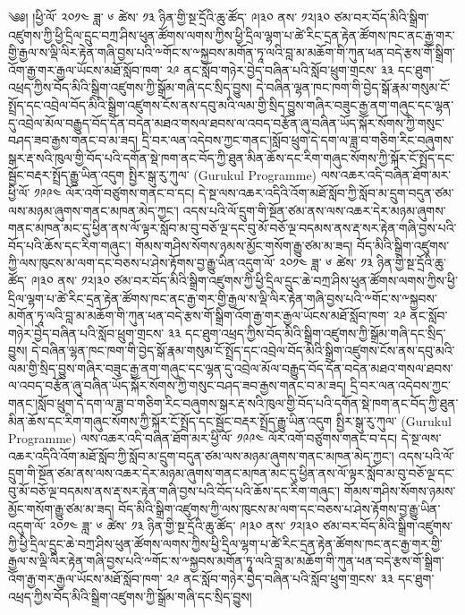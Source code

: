 \documentclass{article}
\begin{document}
\Large ༄༅། །ཕྱི་ལོ་ ༢༠༡༤ ཟླ་ ༦ ཚེས་ ༡༣ ཉིན་གྱི་སྔ་དྲོའི་ཆུ་ཚོད་ ༩།༣༠ ནས་ ༡༢།༣༠ \newpage ཙམ་བར་བོད་མིའི་སྒྲིག་འཛུགས་ཀྱི་ཕྱི་དྲིལ་དྲུང་བཀྲ་ཤིས་ཕུན་ཚོགས་ལགས་ཀྱིས་ཕྱི་དྲིལ་ལྷག་པ་ཚེ་རིང་དྲན་རྟེན་ཚོགས་ཁང་ནང་རྒྱ་གར་གྱི་རྒྱལ་ས་ལྡི་ལིར་རྟེན་གཞི་བྱས་པའི་༸གོང་ས་༸སྐྱབས་མགོན་ཏཱ་ལའི་བླ་མ་མཆོག་གི་ཀུན་ཕན་བདེ་རྩས་གོ་སྒྲིག་འོག་རྒྱ་གར་རྒྱལ་ཡོངས་མཐོ་སློབ་ཁག་ ༢༩ ནང་སློབ་གཉེར་བྱེད་བཞིན་པའི་སློབ་ཕྲུག་གྲངས་ ༣༣ དང་ཐུག་འཕྲད་ཀྱིས་བོད་མིའི་སྒྲིག་འཛུགས་ཀྱི་སྒྲོམ་གཞི་དང་སྲིད་བྱུས། དེ་བཞིན་ལྷན་ཁང་ཁག་གི་བྱེད་སྒོ་རྣམ་གསུམ་ངོ་སྤྲོད་དང་འབྲེལ་བོད་མིའི་སྒྲིག་འཛུགས་ངོས་ནས་དབུ་མའི་ལམ་གྱི་སྲིད་བྱུས་གཞིར་བཟུང་རྒྱ་ནག་གཞུང་དང་ལྷན་དུ་འབྲེལ་མོལ་བརྒྱུད་བོད་དོན་བདེན་མཐའ་གསལ་ཐབས་ལ་འབད་བརྩོན་ཞུ་བཞིན་ཡོད་སྐོར་སོགས་ཀྱི་གསུང་བཤད་ཟབ་རྒྱས་གནང་བ་མ་ཟད། དྲི་བར་ལན་འདེབས་ཀྱང་གནང་།སློབ་ཕྲུག་དེ་དག་ལ་ཟླ་བ་གཅིག་རིང་བཞུགས་སྒར་རྡ་སའི་ཁུལ་གྱི་བོད་པའི་དགོན་སྡེ་ཁག་ནང་བོད་ཀྱི་ཐུན་མིན་ཆོས་དང་རིག་གཞུང་སོགས་ཀྱི་སྐོར་ངོ་སྤྲོད་དང་སྦྱོང་བརྡར་སྤྲོད་རྒྱུ་ཡིན་འདུག སྤྱིར་སྒུ་རུ་ཀུལ་ (Gurukul Programme) ལས་འཆར་འདི་བཞིན་ཐོག་མར་ཕྱི་ལོ་ ༡༩༩༤ ལོར་འགོ་བཙུགས་གནང་བ་དང། དེ་སྔ་ལས་འཆར་འདིའི་འོག་མཐོ་སློབ་ཀྱི་སློབ་མ་དྲུག་བདུན་ཙམ་ལས་མཉམ་ཞུགས་གནང་མཁན་མེད་ཀྱང་། འདས་པའི་ལོ་དྲུག་གི་སྔོན་ཙམ་ནས་ལས་འཆར་དེར་མཉམ་ཞུགས་གནང་མཁན་མང་དུ་ཕྱིན་ནས་ལོ་ལྟར་སློབ་མ་བུ་བཅོ་ལྔ་དང་བུ་མོ་བཅོ་ལྔ་བདམས་ནས་རྡ་སར་རྟེན་གཞི་བྱས་པའི་བོད་པའི་ཆོས་དང་རིག་གཞུང་། གོམས་གཤིས་སོགས་ཉམས་མྱོང་གསོག་རྒྱུ་ཙམ་མ་ཟད། བོད་མིའི་སྒྲིག་འཛུགས་ཀྱི་ལས་ཁུངས་མ་ལག་དང་བཅས་པ་ཤེས་རྟོགས་བྱ་རྒྱུ་ཡིན་འདུག་ལོ་ ༢༠༡༤ ཟླ་ ༦ ཚེས་ ༡༣ ཉིན་གྱི་སྔ་དྲོའི་ཆུ་ཚོད་ ༩།༣༠ ནས་ ༡༢།༣༠ ཙམ་བར་བོད་མིའི་སྒྲིག་འཛུགས་ཀྱི་ཕྱི་དྲིལ་དྲུང་ཆེ་བཀྲ་ཤིས་ཕུན་ཚོགས་ལགས་ཀྱིས་ཕྱི་དྲིལ་ལྷག་པ་ཚེ་རིང་དྲན་རྟེན་ཚོགས་ཁང་ནང་རྒྱ་གར་གྱི་རྒྱལ་ས་ལྡི་ལིར་རྟེན་གཞི་བྱས་པའི་༸གོང་ས་༸སྐྱབས་མགོན་ཏཱ་ལའི་བླ་མ་མཆོག་གི་ཀུན་ཕན་བདེ་རྩས་གོ་སྒྲིག་འོག་རྒྱ་གར་རྒྱལ་ཡོངས་མཐོ་སློབ་ཁག་ ༢༩ ནང་སློབ་གཉེར་བྱེད་བཞིན་པའི་སློབ་ཕྲུག་གྲངས་ ༣༣ དང་ཐུག་འཕྲད་ཀྱིས་བོད་མིའི་སྒྲིག་འཛུགས་ཀྱི་སྒྲོམ་གཞི་དང་སྲིད་བྱུས། དེ་བཞིན་ལྷན་ཁང་ཁག་གི་བྱེད་སྒོ་རྣམ་གསུམ་ངོ་སྤྲོད་དང་འབྲེལ་བོད་མིའི་སྒྲིག་འཛུགས་ངོས་ནས་དབུ་མའི་ལམ་གྱི་སྲིད་བྱུས་གཞིར་བཟུང་རྒྱ་ནག་གཞུང་དང་ལྷན་དུ་འབྲེལ་མོལ་བརྒྱུད་བོད་དོན་བདེན་མཐའ་གསལ་ཐབས་ལ་འབད་བརྩོན་ཞུ་བཞིན་ཡོད་སྐོར་སོགས་ཀྱི་གསུང་བཤད་ཟབ་རྒྱས་གནང་བ་མ་ཟད། དྲི་བར་ལན་འདེབས་ཀྱང་གནང་།སློབ་ཕྲུག་དེ་དག་ལ་ཟླ་བ་གཅིག་རིང་བཞུགས་སྒར་རྡ་སའི་ཁུལ་གྱི་བོད་པའི་དགོན་སྡེ་ཁག་ནང་བོད་ཀྱི་ཐུན་མིན་ཆོས་དང་རིག་གཞུང་སོགས་ཀྱི་སྐོར་ངོ་སྤྲོད་དང་སྦྱོང་བརྡར་སྤྲོད་རྒྱུ་ཡིན་འདུག སྤྱིར་སྒུ་རུ་ཀུལ་ (Gurukul Programme) ལས་འཆར་འདི་བཞིན་ཐོག་མར་ཕྱི་ལོ་ ༡༩༩༤ ལོར་འགོ་བཙུགས་གནང་བ་དང། དེ་སྔ་ལས་འཆར་འདིའི་འོག་མཐོ་སློབ་ཀྱི་སློབ་མ་དྲུག་བདུན་ཙམ་ལས་མཉམ་ཞུགས་གནང་མཁན་མེད་ཀྱང་། འདས་པའི་ལོ་དྲུག་གི་སྔོན་ཙམ་ནས་ལས་འཆར་དེར་མཉམ་ཞུགས་གནང་མཁན་མང་དུ་ཕྱིན་ནས་ལོ་ལྟར་སློབ་མ་བུ་བཅོ་ལྔ་དང་བུ་མོ་བཅོ་ལྔ་བདམས་ནས་རྡ་སར་རྟེན་གཞི་བྱས་པའི་བོད་པའི་ཆོས་དང་རིག་གཞུང་། གོམས་གཤིས་སོགས་ཉམས་མྱོང་གསོག་རྒྱུ་ཙམ་མ་ཟད། བོད་མིའི་སྒྲིག་འཛུགས་ཀྱི་ལས་ཁུངས་མ་ལག་དང་བཅས་པ་ཤེས་རྟོགས་བྱ་རྒྱུ་ཡིན་འདུག་ལོ་ ༢༠༡༤ ཟླ་ ༦ ཚེས་ ༡༣ ཉིན་གྱི་སྔ་དྲོའི་ཆུ་ཚོད་ ༩།༣༠ ནས་ ༡༢།༣༠ ཙམ་བར་བོད་མིའི་སྒྲིག་འཛུགས་ཀྱི་ཕྱི་དྲིལ་དྲུང་ཆེ་བཀྲ་ཤིས་ཕུན་ཚོགས་ལགས་ཀྱིས་ཕྱི་དྲིལ་ལྷག་པ་ཚེ་རིང་དྲན་རྟེན་ཚོགས་ཁང་ནང་རྒྱ་གར་གྱི་རྒྱལ་ས་ལྡི་ལིར་རྟེན་གཞི་བྱས་པའི་༸གོང་ས་༸སྐྱབས་མགོན་ཏཱ་ལའི་བླ་མ་མཆོག་གི་ཀུན་ཕན་བདེ་རྩས་གོ་སྒྲིག་འོག་རྒྱ་གར་རྒྱལ་ཡོངས་མཐོ་སློབ་ཁག་ ༢༩ ནང་སློབ་གཉེར་བྱེད་བཞིན་པའི་སློབ་ཕྲུག་གྲངས་ ༣༣ དང་ཐུག་འཕྲད་ཀྱིས་བོད་མིའི་སྒྲིག་འཛུགས་ཀྱི་སྒྲོམ་གཞི་དང་སྲིད་བྱུས། 
\end{document}

